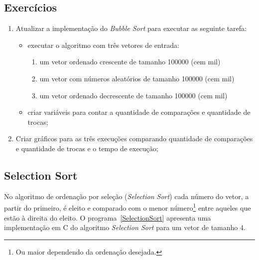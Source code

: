 \documentclass[11pt,fleqn]{book} %
\begin{document}
\subsection*{Exercícios}
\begin{enumerate}
	\item Atualizar a implementação do \textit{Bubble Sort} para executar as seguinte tarefa:
	\begin{itemize}
		\item executar o algoritmo com três vetores de entrada:
		\begin{enumerate}
			\item um vetor ordenado crescente de tamanho 100000 (cem mil)
			\item um vetor com números aleatórios de tamanho 100000 (cem mil)
			\item um vetor ordenado decrescente de tamanho 100000 (cem mil)
		\end{enumerate} 
		\item criar variáveis para contar a quantidade de comparações e quantidade de trocas;
	\end{itemize} 
	\item Criar gráficos para as três execuções comparando quantidade de comparações e quantidade de trocas e o tempo de execução;
\end{enumerate} 

\newpage
\subsection*{Selection Sort}
No algoritmo de ordenação por seleção (\textit{Selection Sort}) cada número do vetor, a partir do primeiro, é eleito e comparado com o menor número\footnote{Ou maior dependendo da ordenação desejada.} entre aqueles que estão à direita do eleito.
O  programa~\ref{SelectionSort} apresenta uma implementação em C do algoritmo \textit{Selection Sort} para um vetor de tamanho 4.
\label{SelectionSort}
\end{document}
